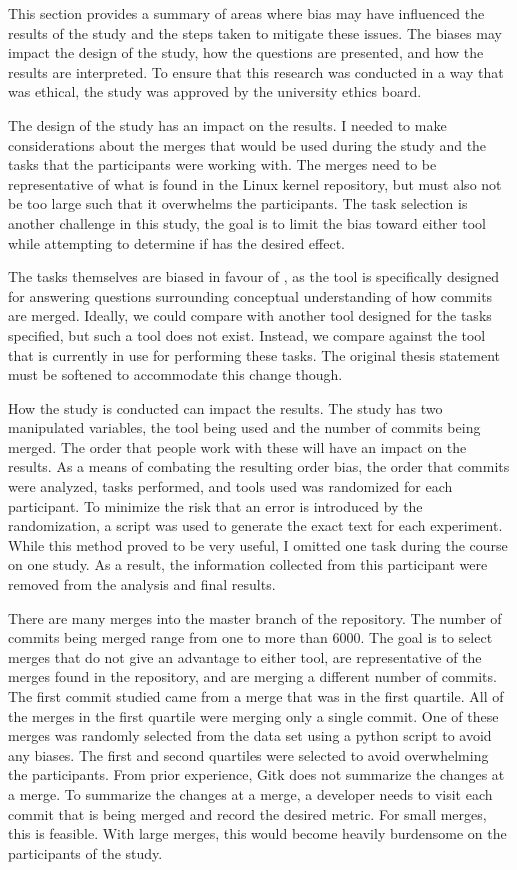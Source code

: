 This section provides a summary of areas where bias may have influenced
the results of the study and the steps taken to mitigate these issues.
The biases may impact the design of the study, how the questions are
presented, and how the results are interpreted.
To ensure that this research was conducted in a way that was ethical,
the study was approved by the university ethics board.

The design of the study has an impact on the results.
I needed to make considerations about the merges that would be used
during the study and the tasks that the participants were working with.
The merges need to be representative of what is found in the Linux
kernel repository, but must also not be too large such that it
overwhelms the participants.
The task selection is another challenge in this study, the goal is to
limit the bias toward either tool while attempting to determine if
\tool{} has the desired effect.

The tasks themselves are biased in favour of \tool{}, as the tool is
specifically designed for answering questions surrounding conceptual
understanding of how commits are merged.
Ideally, we could compare \tool{} with another tool designed for the
tasks specified, but such a tool does not exist.
Instead, we compare against the tool that is currently in use for
performing these tasks.
The original thesis statement must be softened to accommodate this
change though.

How the study is conducted can impact the results.
The study has two manipulated variables, the tool being used and the
number of commits being merged.
The order that people work with these will have an impact on the
results.
As a means of combating the resulting order bias, the order that commits
were analyzed, tasks performed, and tools used was randomized for each
participant.
To minimize the risk that an error is introduced by the randomization, a
script was used to generate the exact text for each experiment.
While this method proved to be very useful,
I omitted one task during the course on one study.
As a result, the information collected from this participant were
removed from the analysis and final results.

There are many merges into the master branch of the repository.
The number of commits being merged range from one to more than 6000.
The goal is to select merges that do not give an advantage to either
tool, are representative of the merges found in the repository, and are
merging a different number of commits.
The first commit studied came from a merge that was in the first
quartile.
All of the merges in the first quartile were merging only a single
commit.
One of these merges was randomly selected from the data set using a
python script to avoid any biases.
The first and second quartiles were selected to avoid overwhelming the
participants.
From prior experience, Gitk does not summarize the changes at a merge.
To summarize the changes at a merge, a developer needs to visit each
commit that is being merged and record the desired metric.
For small merges, this is feasible.
With large merges, this would become heavily burdensome on the
participants of the study.

